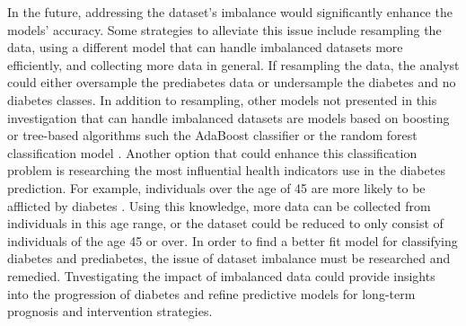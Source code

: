 \documentclass[journal]{IEEEtran}
\begin{document}
In the future, addressing the dataset's imbalance would significantly enhance the models' accuracy. Some strategies to alleviate this issue include resampling the data, using a different model that can handle imbalanced datasets more efficiently, and collecting more data in general. If resampling the data, the analyst could either oversample the prediabetes data or undersample the diabetes and no diabetes classes. In addition to resampling, other models not presented in this investigation that can handle imbalanced datasets are models based on boosting or tree-based algorithms such the AdaBoost classifier or the random forest classification model \cite{b14}. Another option that could enhance this classification problem is researching the most influential health indicators use in the diabetes prediction. For example, individuals over the age of 45 are more likely to be afflicted by diabetes \cite{b1}. Using this knowledge, more data can be collected from individuals in this age range, or the dataset could be reduced to only consist of individuals of the age 45 or over. In order to find a better fit model for classifying diabetes and prediabetes, the issue of dataset imbalance must be researched and remedied. Tnvestigating the impact of imbalanced data could provide insights into the progression of diabetes and refine predictive models for long-term prognosis and intervention strategies.
\end{document}

